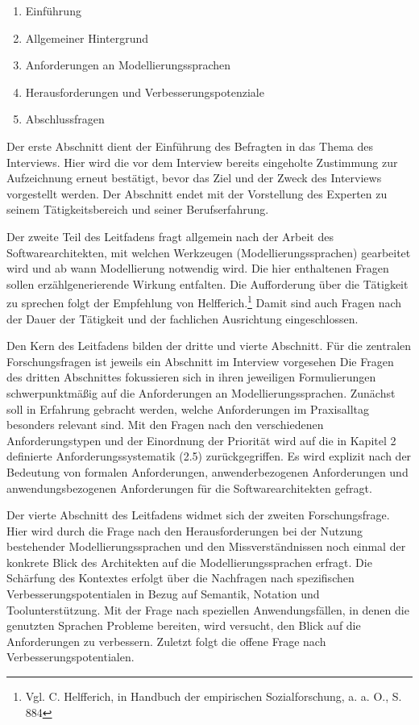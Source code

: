 \begin{enumerate}
    \item Einführung
    \item Allgemeiner Hintergrund
    \item Anforderungen an Modellierungssprachen
    \item Herausforderungen und Verbesserungspotenziale
    \item Abschlussfragen
\end{enumerate}

Der erste Abschnitt dient der Einführung des Befragten in das Thema des Interviews. Hier wird die vor dem Interview bereits eingeholte Zustimmung zur Aufzeichnung erneut bestätigt, bevor das Ziel und der Zweck des Interviews vorgestellt werden. Der Abschnitt endet mit der Vorstellung des Experten zu seinem Tätigkeitsbereich und seiner Berufserfahrung.

Der zweite Teil des Leitfadens fragt allgemein nach der Arbeit des Softwarearchitekten, mit welchen Werkzeugen (Modellierungssprachen) gearbeitet wird und ab wann Modellierung notwendig wird. Die hier enthaltenen Fragen sollen erzählgenerierende Wirkung entfalten. Die Aufforderung über die Tätigkeit zu sprechen folgt der Empfehlung von Helfferich.\footnote{Vgl. C. Helfferich, in Handbuch der empirischen Sozialforschung,  a. a. O., S. 884} Damit sind auch Fragen nach der Dauer der Tätigkeit und der fachlichen Ausrichtung eingeschlossen.

Den Kern des Leitfadens bilden der dritte und vierte Abschnitt. Für die zentralen Forschungsfragen ist jeweils ein Abschnitt im Interview vorgesehen
Die Fragen des dritten Abschnittes fokussieren sich in ihren jeweiligen Formulierungen schwerpunktmäßig auf die Anforderungen an Modellierungssprachen. Zunächst soll in Erfahrung gebracht werden, welche Anforderungen im Praxisalltag besonders relevant sind. Mit den Fragen nach den verschiedenen Anforderungstypen und der Einordnung der Priorität wird auf die in Kapitel 2 definierte Anforderungssystematik (2.5) zurückgegriffen. Es wird explizit nach der Bedeutung von formalen Anforderungen, anwenderbezogenen Anforderungen und anwendungsbezogenen Anforderungen für die Softwarearchitekten gefragt.

Der vierte Abschnitt des Leitfadens widmet sich der zweiten Forschungsfrage. Hier wird durch die Frage nach den Herausforderungen bei der Nutzung bestehender Modellierungssprachen und den Missverständnissen noch einmal der konkrete Blick des Architekten auf die Modellierungssprachen erfragt. Die Schärfung des Kontextes erfolgt über die Nachfragen nach spezifischen Verbesserungspotentialen in Bezug auf Semantik, Notation und Toolunterstützung.
Mit der Frage nach speziellen Anwendungsfällen, in denen die genutzten Sprachen Probleme bereiten, wird versucht, den Blick auf die Anforderungen zu verbessern. Zuletzt folgt die offene Frage nach Verbesserungspotentialen.

